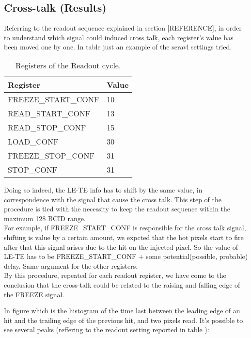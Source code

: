 \subsection{Cross-talk (Results)}

Referring to the readout sequence explained in section [REFERENCE], in order to understand which signal could induced cross talk, each register's value has been moved one by one.
In table  just an example of the seravl settings tried.

\begin{table}[h!]
\centering
\begin{tabular}{>{} C{5cm}|C{1.7cm}}
Register & Value \\
\hline
\textsc{FREEZE\_START\_CONF} & 10\\[0.3ex]
\hline
\textsc{READ\_START\_CONF}& 13 \\[0.3ex]
\hline
\textsc{READ\_STOP\_CONF} & 15 \\[0.3ex]
\hline
\textsc{LOAD\_CONF} & 30 \\[0.3ex]
\hline
\textsc{FREEZE\_STOP\_CONF} & 31\\[0.3ex]
\hline
\textsc{STOP\_CONF} & 31\\[0.3ex]
\hline
\end{tabular}
\caption{Registers of the Readout cycle.}
\label{tab:ro_registers}
\end{table}

Doing so indeed, the LE-TE info has to shift by the same value, in correspondence with the signal that cause the cross talk. This step of the procedure is tied with the necessity to keep the readout sequence within the maximum 128 BCID range.\\

For example, if \textsc{FREEZE\_START\_CONF} is responsible for the cross talk signal, shifting is value by a certain amount, we expcted that the hot pixels start to fire after that this signal arises due to the hit on the injected pixel. So the value of LE-TE has to be \textsc{FREEZE\_START\_CONF} + some potential(possible, probable) delay. Same argument for the other registers. \\

By this procedure, repeated for each readout register, we have come to the conclusion that the cross-talk could be related to the raising and falling edge of the \textsc{FREEZE} signal.

In figure %
which is the histogram of the time last between the leading edge of an hit and the trailing edge of the previous hit, and two pixels read. It's possible to see several peaks (reffering to the readout setting reported in table ):

